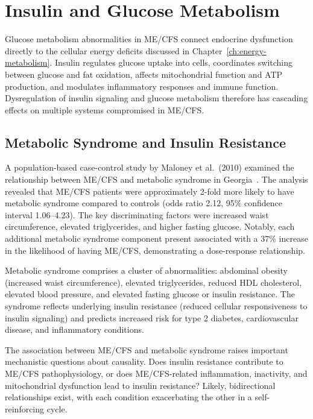\section{Insulin and Glucose Metabolism}
\label{sec:insulin-glucose}

Glucose metabolism abnormalities in ME/CFS connect endocrine dysfunction directly to the cellular energy deficits discussed in Chapter~\ref{ch:energy-metabolism}. Insulin regulates glucose uptake into cells, coordinates switching between glucose and fat oxidation, affects mitochondrial function and ATP production, and modulates inflammatory responses and immune function. Dysregulation of insulin signaling and glucose metabolism therefore has cascading effects on multiple systems compromised in ME/CFS.

\subsection{Metabolic Syndrome and Insulin Resistance}

\begin{achievement}
\label{ach:metabolic-syndrome}
A population-based case-control study by Maloney et al.\ (2010) examined the relationship between ME/CFS and metabolic syndrome in Georgia~\cite{maloney2010metabolic}. The analysis revealed that ME/CFS patients were approximately 2-fold more likely to have metabolic syndrome compared to controls (odds ratio 2.12, 95\% confidence interval 1.06--4.23). The key discriminating factors were increased waist circumference, elevated triglycerides, and higher fasting glucose. Notably, each additional metabolic syndrome component present associated with a 37\% increase in the likelihood of having ME/CFS, demonstrating a dose-response relationship.
\end{achievement}

Metabolic syndrome comprises a cluster of abnormalities: abdominal obesity (increased waist circumference), elevated triglycerides, reduced HDL cholesterol, elevated blood pressure, and elevated fasting glucose or insulin resistance. The syndrome reflects underlying insulin resistance (reduced cellular responsiveness to insulin signaling) and predicts increased risk for type 2 diabetes, cardiovascular disease, and inflammatory conditions.

The association between ME/CFS and metabolic syndrome raises important mechanistic questions about causality. Does insulin resistance contribute to ME/CFS pathophysiology, or does ME/CFS-related inflammation, inactivity, and mitochondrial dysfunction lead to insulin resistance? Likely, bidirectional relationships exist, with each condition exacerbating the other in a self-reinforcing cycle.

